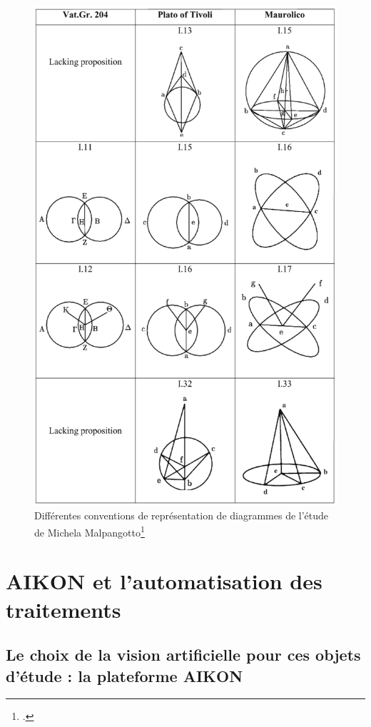 \documentclass[a4paper,12pt,twoside]{book}
\newcommand{\clearemptydoublepage}{\newpage{\pagestyle{empty}\cleardoublepage}}
\begin{document}
	\begin{figure}[h]
		\centering
		\includegraphics[width=0.9\linewidth]{images/conventions_diagrammes.png}
		\caption{Différentes conventions de représentation de diagrammes de l'étude de Michela Malpangotto\footcite{malpangottoGraphicalChoicesGeometrical2010}}
		\label{fig:conventions}
	\end{figure}
	
	
	
	
	\clearemptydoublepage
	
	\chapter{AIKON et l'automatisation des traitements}
	\section{Le choix de la vision artificielle pour ces objets d'étude : la plateforme AIKON}
	
	
\end{document}
